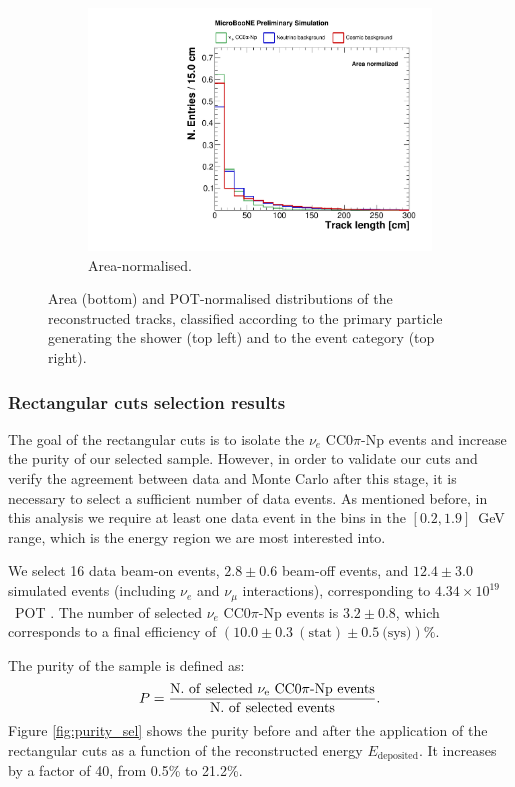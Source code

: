 \begin{figure}[htbp]
\begin{subfigure}{0.49\textwidth}
    \includegraphics[width=\linewidth]{figures/h_track_length_norm.pdf}
    \caption{Area-normalised.} \label{fig:length_norm}
  \end{subfigure}
  \caption{Area (bottom) and POT-normalised distributions of the reconstructed tracks, classified according to the primary particle generating the shower (top left) and to the event category (top right).}
\end{figure}

\subsubsection{Rectangular cuts selection results}
The goal of the rectangular cuts is to isolate the $\nu_e$ CC0$\pi$-Np events and increase the purity of our selected sample. However, in order to validate our cuts and verify the agreement between data and Monte Carlo after this stage, it is necessary to select a sufficient number of data events. As mentioned before, in this analysis we require at least one data event in the bins in the $[0.2,1.9]$~GeV range, which is the energy region we are most interested into. 

We select 16 data beam-on events, $2.8\pm0.6$ beam-off events, and $12.4\pm3.0$ simulated events (including $\nu_e$ and $\nu_{\mu}$ interactions), corresponding to $4.34\times10^{19}$~POT . The number of selected $\nu_e$ CC0$\pi$-Np events is $3.2\pm0.8$, which corresponds to a final efficiency of $(10.0\pm0.3~\mathrm{(stat)}\pm0.5~\text{(sys)})\%$. 

The purity of the sample is defined as:
\begin{equation}
P = \frac{\mathrm{N.~of~selected~\nu_e~CC0}\pi\mathrm{{\text -}Np~events}}{\mathrm{N.~of~selected~events}}.
\end{equation}
Figure \ref{fig:purity_sel} shows the purity before and after the application of the rectangular cuts as a function of the reconstructed energy $E_{\mathrm{deposited}}$. It increases by a factor of 40, from 0.5\% to 21.2\%.

